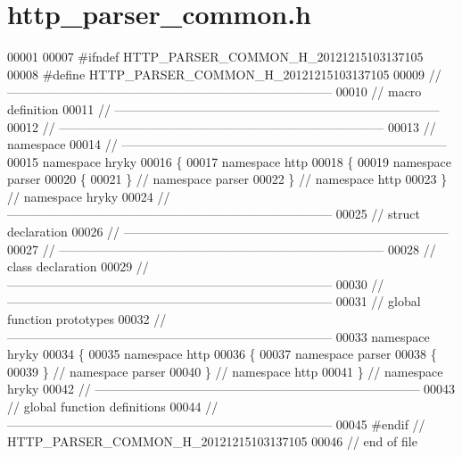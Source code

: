 \hypertarget{http__parser__common_8h_source}{\section{http\-\_\-parser\-\_\-common.\-h}
}

\begin{DoxyCode}
00001 
00007 \textcolor{preprocessor}{#ifndef HTTP\_PARSER\_COMMON\_H\_20121215103137105}
00008 \textcolor{preprocessor}{}\textcolor{preprocessor}{#define HTTP\_PARSER\_COMMON\_H\_20121215103137105}
00009 \textcolor{preprocessor}{}\textcolor{comment}{//
      ------------------------------------------------------------------------------}
00010 \textcolor{comment}{// macro definition}
00011 \textcolor{comment}{//
      ------------------------------------------------------------------------------}
00012 \textcolor{comment}{//
      ------------------------------------------------------------------------------}
00013 \textcolor{comment}{// namespace}
00014 \textcolor{comment}{//
      ------------------------------------------------------------------------------}
00015 \textcolor{keyword}{namespace }hryky
00016 \{
00017 \textcolor{keyword}{namespace }http
00018 \{
00019 \textcolor{keyword}{namespace }parser
00020 \{
00021 \} \textcolor{comment}{// namespace parser}
00022 \} \textcolor{comment}{// namespace http}
00023 \} \textcolor{comment}{// namespace hryky}
00024 \textcolor{comment}{//
      ------------------------------------------------------------------------------}
00025 \textcolor{comment}{// struct declaration}
00026 \textcolor{comment}{//
      ------------------------------------------------------------------------------}
00027 \textcolor{comment}{//
      ------------------------------------------------------------------------------}
00028 \textcolor{comment}{// class declaration}
00029 \textcolor{comment}{//
      ------------------------------------------------------------------------------}
00030 \textcolor{comment}{//
      ------------------------------------------------------------------------------}
00031 \textcolor{comment}{// global function prototypes}
00032 \textcolor{comment}{//
      ------------------------------------------------------------------------------}
00033 \textcolor{keyword}{namespace }hryky
00034 \{
00035 \textcolor{keyword}{namespace }http
00036 \{
00037 \textcolor{keyword}{namespace }parser
00038 \{
00039 \} \textcolor{comment}{// namespace parser}
00040 \} \textcolor{comment}{// namespace http}
00041 \} \textcolor{comment}{// namespace hryky}
00042 \textcolor{comment}{//
      ------------------------------------------------------------------------------}
00043 \textcolor{comment}{// global function definitions}
00044 \textcolor{comment}{//
      ------------------------------------------------------------------------------}
00045 \textcolor{preprocessor}{#endif // HTTP\_PARSER\_COMMON\_H\_20121215103137105}
00046 \textcolor{preprocessor}{}\textcolor{comment}{// end of file}
\end{DoxyCode}
